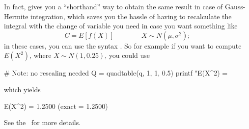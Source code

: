 In fact,  gives you a ``shorthand'' way to obtain the same
result in case of Gauss-Hermite integration, which saves you the
hassle of having to recalculate the integral with the change of
variable you need in case you want something like
\[
  C = E\left[f(X)\right] \qquad \mathrm \qquad X \sim N(\mu, \sigma^2);
\]
in these cases, you can use the syntax . So
for example if you want to compute $E(X^2)$, where $X \sim N(1,
0.25)$, you could use
\begin{code}
# Note: no rescaling needed
Q = quadtable(q, 1, 1, 0.5)
printf "E(X^2) = %
\end{code}
which yields
\begin{code}
  E(X^2) = 1.2500 (exact = 1.2500)
\end{code}
See the \GCR\ for more details.


